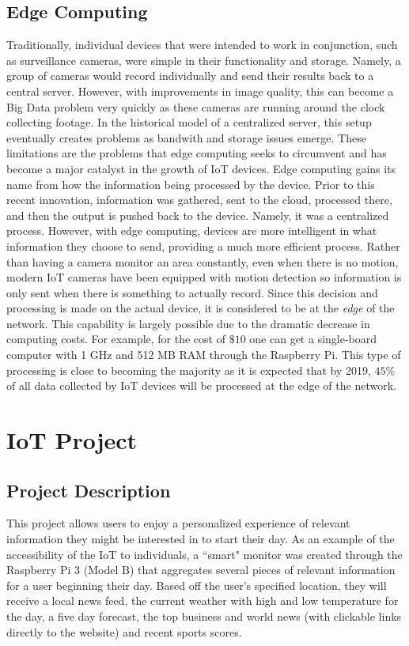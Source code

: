 \documentclass[sigconf]{acmart}
\begin{document}
\subsection{Edge Computing}
Traditionally, individual devices that were intended to work in conjunction, such as surveillance cameras, were simple in their functionality and storage. Namely, a group of cameras would record individually and send their results back to a central server. However, with improvements in image quality, this can become a Big Data problem very quickly as these cameras are running around the clock collecting footage. In the historical model of a centralized server, this setup eventually creates problems as bandwith and storage issues emerge. These limitations are the problems that edge computing seeks to circumvent and has become a major catalyst in the growth of IoT devices. 
Edge computing gains its name from how the information being processed by the device. Prior to this recent innovation, information was gathered, sent to the cloud, processed there, and then the output is pushed back to the device. Namely, it was a centralized process. However, with edge computing, devices are more intelligent in what information they choose to send, providing a much more efficient process. Rather than having a camera monitor an area constantly, even when there is no motion, modern IoT cameras have been equipped with motion detection so information is only sent when there is something to actually record. Since this decision and processing is made on the actual device, it is considered to be at the \emph{edge} of the network.  %
This capability is largely possible due to the dramatic decrease in computing costs. For example, for the cost of $\$10$ one can get a single-board computer with 1 GHz and 512 MB RAM through the Raspberry Pi. This type of processing is close to becoming the majority as it is expected that by 2019, $45\%$ of all data collected by IoT devices will be processed at the edge of the network. 
\section{IoT Project}
\subsection{Project Description}
This project allows users to enjoy a personalized experience of relevant information they might be interested in to start their day.
As an example of the accessibility of the IoT to individuals, a ``smart" monitor was created through the Raspberry Pi 3 (Model B) that aggregates several pieces of relevant information for a user beginning their day. Based off the user's specified location, they will receive a local news feed, the current weather with high and low temperature for the day, a five day forecast, the top business and world news (with clickable links directly to the website) and recent sports scores. 
\end{document}
